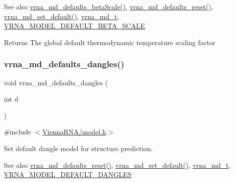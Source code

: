 \begin{DoxySeeAlso}{See also}
\mbox{\hyperlink{group__model__details_gae984567db36c3f9b8731ecc917abf3a2}{vrna\+\_\+md\+\_\+defaults\+\_\+beta\+Scale()}}, \mbox{\hyperlink{group__model__details_ga70834424cf804d149937de89f80ceb45}{vrna\+\_\+md\+\_\+defaults\+\_\+reset()}}, \mbox{\hyperlink{group__model__details_ga8ac6ff84936282436f822644bf841f66}{vrna\+\_\+md\+\_\+set\+\_\+default()}}, \mbox{\hyperlink{group__model__details_ga1f8a10e12a0a1915f2a4eff0b28ea17c}{vrna\+\_\+md\+\_\+t}}, \mbox{\hyperlink{group__model__details_ga383d3ac8d08c3b6221754b50871c1200}{V\+R\+N\+A\+\_\+\+M\+O\+D\+E\+L\+\_\+\+D\+E\+F\+A\+U\+L\+T\+\_\+\+B\+E\+T\+A\+\_\+\+S\+C\+A\+LE}} 
\end{DoxySeeAlso}
\begin{DoxyReturn}{Returns}
The global default thermodynamic temperature scaling factor 
\end{DoxyReturn}
\mbox{\label{group__model__details_gac76a5374def8e5e4e644ff6e4cc72dee}} 
\subsubsection{\texorpdfstring{vrna\_md\_defaults\_dangles()}{vrna\_md\_defaults\_dangles()}}
{\footnotesize\ttfamily void vrna\+\_\+md\+\_\+defaults\+\_\+dangles (\begin{DoxyParamCaption}\item[{int}]{d }\end{DoxyParamCaption})}



{\ttfamily \#include $<$\mbox{\hyperlink{model_8h}{Vienna\+R\+N\+A/model.\+h}}$>$}



Set default dangle model for structure prediction. 

\begin{DoxySeeAlso}{See also}
\mbox{\hyperlink{group__model__details_ga70834424cf804d149937de89f80ceb45}{vrna\+\_\+md\+\_\+defaults\+\_\+reset()}}, \mbox{\hyperlink{group__model__details_ga8ac6ff84936282436f822644bf841f66}{vrna\+\_\+md\+\_\+set\+\_\+default()}}, \mbox{\hyperlink{group__model__details_ga1f8a10e12a0a1915f2a4eff0b28ea17c}{vrna\+\_\+md\+\_\+t}}, \mbox{\hyperlink{group__model__details_ga2aa7bc2cae774b83a5c468f824c27a42}{V\+R\+N\+A\+\_\+\+M\+O\+D\+E\+L\+\_\+\+D\+E\+F\+A\+U\+L\+T\+\_\+\+D\+A\+N\+G\+L\+ES}} 
\end{DoxySeeAlso}


